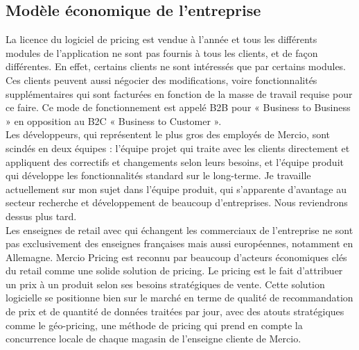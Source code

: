 \documentclass{rapportCS}
\begin{document}
\subsection{Modèle économique de l'entreprise}
	La licence du logiciel de pricing est vendue à l'année et tous les différents modules de 
	l'application ne sont pas fournis à tous les clients, et de façon différentes.
	En effet, certains clients ne sont intéressés que par certains modules.
	Ces clients peuvent aussi négocier des modifications, voire fonctionnalités supplémentaires 
	qui sont facturées en fonction de la masse de travail requise pour ce faire. 
	Ce mode de fonctionnement est appelé B2B pour « Business to Business » en opposition 
	au B2C « Business to Customer ». \\
	Les développeurs, qui représentent le plus gros des employés de Mercio, sont scindés en 
	deux équipes : l'équipe projet qui traite avec les clients directement et appliquent des 
	correctifs et changements selon leurs besoins, et l'équipe produit qui développe les 
	fonctionnalités standard sur le long-terme. Je travaille actuellement sur mon sujet dans 
	l'équipe produit, qui s'apparente d'avantage au secteur recherche et développement de beaucoup 
	d'entreprises. Nous reviendrons dessus plus tard. \\
	Les enseignes de retail avec qui échangent les commerciaux de l'entreprise ne sont pas 
	exclusivement des enseignes françaises mais aussi européennes, notamment en Allemagne.
	Mercio Pricing est reconnu par beaucoup d'acteurs économiques clés du retail comme une solide 
	solution de pricing. 
	Le pricing est le fait d'attribuer un prix à un produit selon ses besoins stratégiques de vente. 
	Cette solution logicielle se positionne bien sur le marché en terme de qualité de recommandation 
	de prix et de quantité de données traitées par jour, avec des atouts stratégiques comme le 
	géo-pricing, une méthode de pricing qui prend en compte la concurrence locale de chaque magasin de 
	l'enseigne cliente de Mercio. \\
\end{document}
